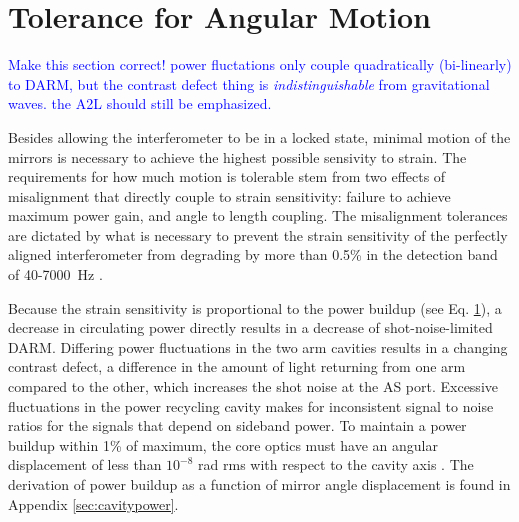 









\section{Tolerance for Angular Motion}
\textcolor{blue}{Make this section correct! power fluctations only couple quadratically (bi-linearly) to DARM, but the contrast defect thing is \emph{indistinguishable} from gravitational waves. the A2L should still be emphasized.}

Besides allowing the interferometer to be in a locked state, minimal motion of the mirrors is necessary to achieve the highest possible sensivity to strain. The requirements for how much motion is tolerable stem from two effects of misalignment that directly couple to strain sensitivity: failure to achieve maximum power gain, and angle to length coupling. The misalignment tolerances are dictated by what is necessary to prevent the strain sensitivity of the perfectly aligned interferometer from degrading by more than 0.5\% in the detection band of 40-7000~Hz \cite{Fritschel1997Alignment}.

Because the strain sensitivity is proportional to the power buildup (see Eq. \ref{}), a decrease in circulating power directly results in a decrease of shot-noise-limited DARM. Differing power fluctuations in the two arm cavities results in a changing contrast defect, a difference in the amount of light returning from one arm compared to the other, which increases the shot noise at the AS port. Excessive fluctuations in the power recycling cavity makes for inconsistent signal to noise ratios for the signals that depend on sideband power. To maintain a power buildup within 1\% of maximum, the core optics must have an angular displacement of less than $10^{-8}$ rad rms with respect to the cavity axis \cite{ISCGroup1998ASC}. The derivation of power buildup as a function of mirror angle displacement is found in Appendix \ref{sec:cavitypower}.


